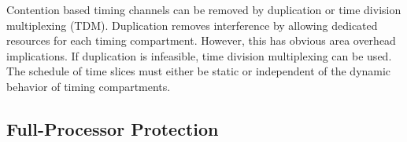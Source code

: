 Contention based timing channels can be removed by duplication or 
time division multiplexing (TDM). Duplication removes interference by
allowing dedicated resources for each timing compartment.
However, this has obvious area overhead implications. If 
duplication is infeasible, time division multiplexing can be used.
The schedule of time slices must either be static or independent of the 
dynamic behavior of timing compartments.

%


\subsection{Full-Processor Protection}

